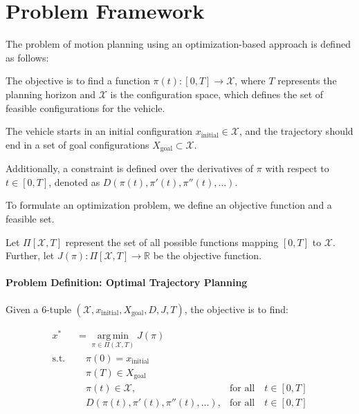 \chapter{Problem Framework}

The problem of motion planning using an optimization-based approach is defined as follows:

The objective is to find a function
$\pi(t): [0,T] \to \mathcal{X}$, where $T$ represents the planning horizon and $\mathcal{X}$ is the configuration space, which defines the set of
feasible configurations for the vehicle.

The vehicle starts in an initial configuration $x_{\text{initial}} \in \mathcal{X}$, and the trajectory should end in a set of goal configurations
$X_{\text{goal}} \subset \mathcal{X}$.

Additionally, a constraint is defined over the derivatives of $\pi$ with respect to $t \in [0, T]$, denoted as $D(\pi(t), \pi'(t), \pi''(t), \dots)$.

To formulate an optimization problem, we define an objective function and a feasible set.

Let $\Pi[\mathcal{X}, T]$ represent the set of all possible functions mapping $[0, T]$ to $\mathcal{X}$.
Further, let $J(\pi): \Pi[\mathcal{X}, T] \to \mathbb{R}$ be the objective function.

\subsubsection{Problem Definition: Optimal Trajectory Planning}

Given a 6-tuple $(\mathcal{X}, x_{\text{initial}}, X_{\text{goal}}, D, J, T)$, the objective is to find:

\begin{align}
	x^* & = \underset{\pi \in \Pi(\mathcal{X},T)}{\operatorname{arg\,min}}
	J(\pi)                                                                                                                        \\ \text{s.t.
	}   & \quad \pi(0) = x_{\text{initial}}                                                                                       \\
	    & \quad \pi(T) \in X_{\text{goal}}                                                                                        \\
	    & \quad \pi(t) \in \mathcal{X},                                    & \text{for all} \quad t \in [0,T]                     \\
	    & \quad D(\pi(t), \pi'(t), \pi''(t), \dots),                       & \text{for all} \quad t \in [0,T] \label{eq:dynamics}
\end{align}

